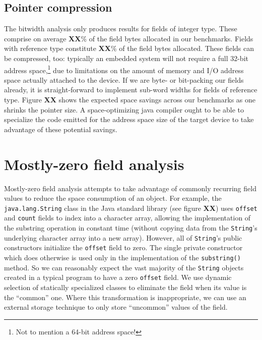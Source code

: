 \documentclass[preprint]{acmconf}
\begin{document}
\subsection{Pointer compression}\label{sec:ptrcmp}
The bitwidth analysis only produces results for fields of integer type.
These comprise on average {\bf XX}\% of the field bytes allocated in
our benchmarks.  Fields with reference type constitute {\bf XX}\% of
the field bytes allocated.  These fields can be compressed, too:
typically an embedded system will not require a full 32-bit address
space,\footnote{Not to mention a 64-bit address space!} due to
limitations on the amount of memory and I/O address space actually attached
to the device.  If we are byte- or bit-packing our fields already,
it is straight-forward to implement sub-word widths for fields of
reference type.  Figure {\bf XX} shows the expected space savings
across our benchmarks as one shrinks the pointer size.  A
space-optimizing java compiler ought to be able to specialize the code
emitted for the address space size of the target device to take
advantage of these potential savings.

\section{Mostly-zero field analysis}

Mostly-zero field analysis attempts to take advantage of commonly
recurring field values to reduce the space consumption of an object.
For example, the {\tt java.lang.String} class in the Java standard
library (see figure {\bf XX}) uses {\tt offset} and {\tt count} fields
to index into a character array, allowing the implementation of the
substring operation in constant time (without copying data from the
{\tt String}'s underlying character array into a new array).  However,
all of {\tt String}'s public constructors initialize the {\tt offset}
field to zero.  The single private constructor which does otherwise is
used only in the implementation of the {\tt substring()} method.  So
we can reasonably expect the vast majority of the {\tt String} objects
created in a typical program to have a zero {\tt offset} field.
We use dynamic selection of statically specialized classes to
eliminate the field when its value is the ``common'' one.
Where this transformation is inappropriate, we can use an external
storage technique to only store ``uncommon'' values of the field.
\end{document}

